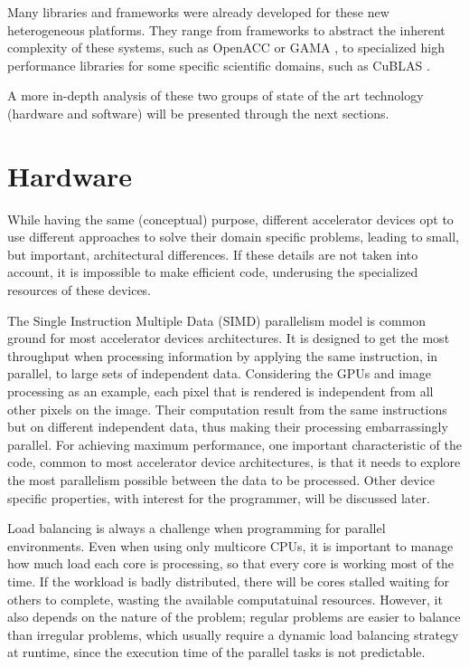 Many libraries and frameworks were already developed for these new heterogeneous platforms. They range from frameworks to abstract the inherent complexity of these systems, such as OpenACC \cite{OpenACC} or GAMA \cite{GAMA}, to specialized high performance libraries for some specific scientific domains, such as CuBLAS \cite{NVIDIA:CuBLAS}.

A more in-depth analysis of these two groups of state of the art technology (hardware and software) will be presented through the next sections.

\section{Hardware}

While having the same (conceptual) purpose, different accelerator devices opt to use different approaches to solve their domain specific problems, leading to small, but important, architectural differences. If these details are not taken into account, it is impossible to make efficient code, underusing the specialized resources of these devices.

The Single Instruction Multiple Data (SIMD) parallelism model is common ground for most accelerator devices architectures. It is designed to get the most throughput when processing information by applying the same instruction, in parallel, to large sets of independent data. Considering the GPUs and image processing as an example, each pixel that is rendered is independent from all other pixels on the image. Their computation result from the same instructions but on different independent data, thus making their processing embarrassingly parallel. For achieving maximum performance, one important characteristic of the code, common to most accelerator device architectures, is that it needs to explore the most parallelism possible between the data to be processed. Other device specific properties, with interest for the programmer, will be discussed later.

Load balancing is always a challenge when programming for parallel environments. Even when using only multicore CPUs, it is important to manage how much load each core is processing, so that every core is working most of the time. If the workload is badly distributed, there will be cores stalled waiting for others to complete, wasting the available computatuinal resources. However, it also depends on the nature of the problem; regular problems are easier to balance than irregular problems, which usually require a dynamic load balancing strategy at runtime, since the execution time of the parallel tasks is not predictable.

